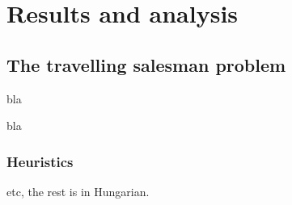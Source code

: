 \chapter{Results and analysis}\label{ch:Results}


\section{The travelling salesman problem}

bla

bla

\subsection{Heuristics}

etc, the rest is in Hungarian.
